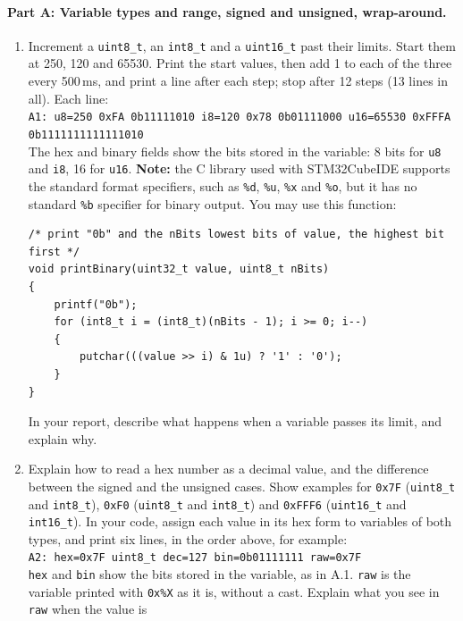 \documentclass[11pt,a4paper]{article}
\begin{document}
\paragraph{Part A: Variable types and range, signed and unsigned, wrap-around.}
\begin{enumerate}[label=A.\arabic*, leftmargin=2.2em]
  \item Increment a \texttt{uint8\_t}, an \texttt{int8\_t} and a \texttt{uint16\_t} past their limits. Start them at
        250, 120 and 65530. Print the start values, then add 1 to each of the three every 500\,ms, and print a line
        after each step; stop after 12 steps (13 lines in all). Each line:\\
        {\footnotesize\texttt{A1: u8=250 0xFA 0b11111010 i8=120 0x78 0b01111000 u16=65530 0xFFFA 0b1111111111111010}}\\
        The hex and binary fields show the bits stored in the variable: 8 bits for \texttt{u8} and \texttt{i8}, 16
        for \texttt{u16}.
        \textbf{Note:} the C library used with STM32CubeIDE supports the standard format specifiers, such as
        \texttt{\%d}, \texttt{\%u}, \texttt{\%x} and \texttt{\%o}, but it has no standard \texttt{\%b} specifier for
        binary output. You may use this function:
\begin{lstlisting}
/* print "0b" and the nBits lowest bits of value, the highest bit first */
void printBinary(uint32_t value, uint8_t nBits)
{
    printf("0b");
    for (int8_t i = (int8_t)(nBits - 1); i >= 0; i--)
    {
        putchar(((value >> i) & 1u) ? '1' : '0');
    }
}
\end{lstlisting}
        In your report, describe what happens when a variable passes its limit, and explain why.
  \item Explain how to read a hex number as a decimal value, and the difference between the signed and the unsigned
        cases. Show examples for \texttt{0x7F} (\texttt{uint8\_t} and \texttt{int8\_t}), \texttt{0xF0}
        (\texttt{uint8\_t} and \texttt{int8\_t}) and \texttt{0xFFF6} (\texttt{uint16\_t} and \texttt{int16\_t}).
        In your code, assign each value in its hex form to variables of both types, and print six lines, in the order
        above, for example:\\
        \texttt{A2: hex=0x7F uint8\_t dec=127 bin=0b01111111 raw=0x7F}\\
        \texttt{hex} and \texttt{bin} show the bits stored in the variable, as in A.1. \texttt{raw} is the variable
        printed with \texttt{0x\%X} as it is, without a cast. Explain what you see in \texttt{raw} when the value is

\end{enumerate}
\end{document}
